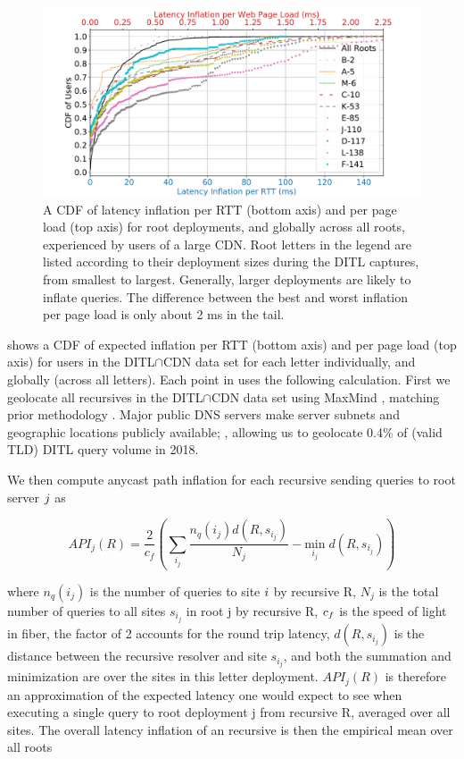 \documentclass[sigconf,letterpaper,nonacm,10pt,anonymous]{acmart}
\begin{document}
\begin{figure}
    \centering
    \includegraphics[width=\linewidth]{figures/API_per_RTT_PL_all_letters.pdf}
    \caption{A CDF of latency inflation per RTT (bottom axis) and per page load (top axis) for root deployments, and globally across all roots, experienced by users of a large CDN. Root letters in the legend are listed according to their deployment sizes during the DITL captures, from smallest to largest. Generally, larger deployments are likely to inflate queries. The difference between the best and worst inflation per page load is only about 2 ms in the tail. }
    \label{fig:api_per_rtt_roots}
\end{figure}

 shows a CDF of expected inflation per RTT
(bottom axis) and per page load (top axis) for users in the
DITL\(\cap\)CDN data set for each letter individually, and globally
(across all letters). Each point in  uses
the following calculation. First we geolocate all recursives in the
DITL\(\cap\)CDN data set using MaxMind \cite{maxmind}, matching prior
methodology \cite{li_levin_spring_bhattacharjee_2018}. Major public DNS
servers make server subnets and geographic locations publicly available;
\cite{google_public_dns}, allowing us to geolocate 0.4\% of (valid TLD)
DITL query volume in 2018.

We then compute anycast path inflation for each recursive sending
queries to root server \(\mathnormal{j}\) as

\begin{equation}
\label{eq:root_dns_path_inflation}
API_{j}(R) = \frac{2}{c_f} (\sum_{i_{j}} \frac{n_q(i_j) d(R, s_{i_{j}})}{N_j} -  \underset{{i_j}} {\text{min}} \; d(R, s_{i_{j}}))
\end{equation}

where \(n_q(i_j)\) is the number of queries to site \(\mathnormal{i}\)
by recursive R, \(N_j\) is the total number of queries to all sites
\(s_{i_{j}}\) in root j by recursive R, \(\mathnormal{c_f}\) is the
speed of light in fiber, the factor of 2 accounts for the round trip
latency, \(d(R, s_{i_{j}})\) is the distance between the recursive
resolver and site \(s_{i_{j}}\), and both the summation and minimization
are over the sites in this letter deployment. \(API_{j} (R)\) is
therefore an approximation of the expected latency one would expect to
see when executing a single query to root deployment j from recursive R,
averaged over all sites. The overall latency inflation of an recursive
is then the empirical mean over all roots
\end{document}
